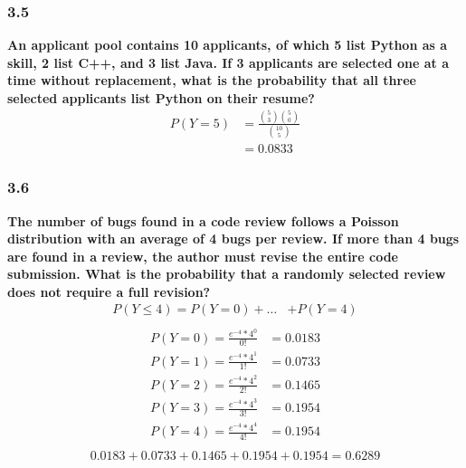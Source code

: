 \documentclass[
	a4paper, %
	10pt, %
	unnumberedsections, %
	twoside, %
]{LTJournalArticle}
\begin{document}
\subsubsection{3.5}
\textbf{An applicant pool contains 10 applicants, of which 5 list Python as a skill, 2 list C++, and 3 list Java. If 3 applicants are selected one at a time without replacement, what is the probability that all three selected applicants list Python on their resume?}
\begin{equation*}
    \begin{aligned}
        P(Y = 5) &= \frac{\binom{5}{3} \binom{5}{0}} {\binom{10}{5}} \\
        &= 0.0833
    \end{aligned}
\end{equation*}
\vspace*{1pt}\noindent
\subsubsection{3.6}
\textbf{The number of bugs found in a code review follows a Poisson distribution with an average of 4 bugs per review. If more than 4 bugs are found in a review, the author must revise the entire code submission. What is the probability that a randomly selected review does not require a full revision?}
\begin{equation*}
    \begin{aligned}
        P(Y \le 4) = P(Y = 0) + \ldots &+ P(Y = 4) \\
    \end{aligned}
\end{equation*}
\begin{equation*}
    \begin{aligned}
        P(Y = 0) = \frac{e^{-4} * 4^0}{0!} &= 0.0183 \\
        P(Y = 1) = \frac{e^{-4} * 4^1}{1!} &= 0.0733 \\
        P(Y = 2) = \frac{e^{-4} * 4^2}{2!} &= 0.1465 \\
        P(Y = 3) = \frac{e^{-4} * 4^3}{3!} &= 0.1954 \\
        P(Y = 4) = \frac{e^{-4} * 4^4}{4!} &= 0.1954 \\
    \end{aligned}
\end{equation*}
\begin{equation*}
    \begin{aligned}
        0.0183 + 0.0733 + 0.1465 + 0.1954 + 0.1954 = 0.6289
    \end{aligned}
\end{equation*}
\vspace*{1pt}\noindent
\end{document}
